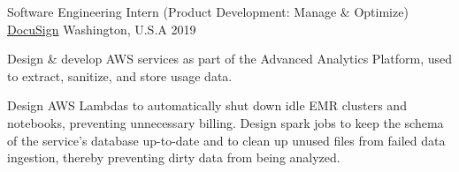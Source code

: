 \begin{cventries}

  \cvwork
    {Software Engineering Intern (Product Development: Manage \& Optimize)} %
    {\href{https://www.docusign.com/}{DocuSign}} %
    {Washington, U.S.A} %
    {2019} %
    {
      \begin{cvitems} %
        \item {
          Design \& develop AWS services as part of the Advanced Analytics Platform, used to extract, sanitize, and store usage data.
        }
        \item {
          Design AWS Lambdas to automatically shut down idle EMR clusters and notebooks, preventing unnecessary billing.
          Design spark jobs to keep the schema of the service's database up-to-date and to clean up unused files from failed data ingestion, thereby preventing dirty data from being analyzed.
        }
      \end{cvitems}
    }

\end{cventries}

